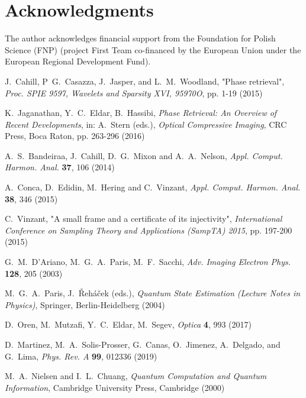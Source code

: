 \documentclass[aps,pra,reprint,groupedaddress,showkeys]{revtex4-1}
\begin{document}
\section*{Acknowledgments}

The author acknowledges financial support from the Foundation for Polish Science (FNP) (project First Team co-financed by the European Union under the European Regional Development Fund).

\begin{thebibliography}{1}

J.~Cahill, P~G.~Casazza, J.~Jasper, and L.~M.~Woodland, "Phase retrieval", \textit{Proc. SPIE 9597, Wavelets and Sparsity XVI, 95970O}, pp. 1-19 (2015) 

K.~Jaganathan, Y.~C.~Eldar, B.~Hassibi, \textit{Phase Retrieval: An Overview of Recent Developments}, in: A.~Stern (eds.), \textit{Optical Compressive Imaging}, CRC Press, Boca Raton, pp. 263-296 (2016)

A.~S.~Bandeiraa, J.~Cahill, D.~G.~Mixon and A.~A.~Nelson, \textit{Appl. Comput. Harmon. Anal.} \textbf{37}, 106 (2014)  

A.~Conca, D.~Edidin, M.~Hering and C.~Vinzant, \textit{Appl. Comput. Harmon. Anal.} \textbf{38}, 346 (2015)  

C.~Vinzant, "A small frame and a certificate of its injectivity", \textit{International Conference on Sampling Theory and Applications (SampTA) 2015}, pp. 197-200 (2015)  

G.~M.~D'Ariano,  M.~G.~A.~Paris, M.~F.~Sacchi, \textit{Adv. Imaging Electron Phys.} \textbf{128}, 205 (2003) 

M.~G.~A.~Paris, J.~\v{R}eh\'{a}\v{c}ek (eds.), \textit{Quantum State Estimation (Lecture Notes in Physics)}, Springer, Berlin-Heidelberg (2004) 

D.~Oren, M.~Mutzafi, Y.~C.~Eldar, M.~Segev, \textit{Optica} \textbf{4}, 993 (2017) 

D.~Martinez, M.~A.~Solis-Prosser, G.~Canas, O.~Jimenez, A.~Delgado, and G.~Lima, \textit{Phys. Rev. A} \textbf{99}, 012336 (2019) 

M.~A.~Nielsen and I.~L.~Chuang, \textit{Quantum Computation and Quantum Information}, Cambridge University Press, Cambridge (2000) 


\end{thebibliography}
\end{document}
